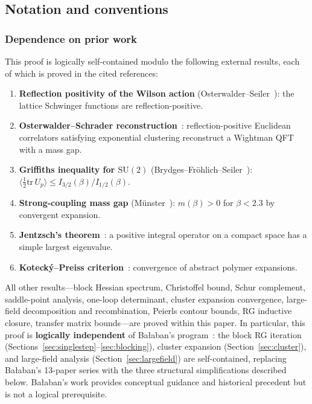 \documentclass[11pt]{article}
\theoremstyle{definition}
\newcommand{\SU}{\mathrm{SU}}
\newcommand{\tr}{\mathrm{tr}}
\begin{document}
\subsection{Notation and conventions}

\subsubsection*{Dependence on prior work}

This proof is logically self-contained modulo the following external
results, each of which is proved in the cited references:

\begin{enumerate}[nosep,label=(E\arabic*)]
\item \textbf{Reflection positivity of the Wilson action}
(Osterwalder--Seiler~\cite{OS78}): the lattice Schwinger functions
are reflection-positive.
\item \textbf{Osterwalder--Schrader reconstruction}~\cite{OS73}:
reflection-positive Euclidean correlators satisfying exponential
clustering reconstruct a Wightman QFT with a mass gap.
\item \textbf{Griffiths inequality for $\SU(2)$}
(Brydges--Fr\"ohlich--Seiler~\cite{FroehlichSimon}):
$\langle\frac{1}{2}\tr\,U_p\rangle\le I_{3/2}(\beta)/I_{1/2}(\beta)$.
\item \textbf{Strong-coupling mass gap} (M\"unster~\cite{Munster81}):
$m(\beta)>0$ for $\beta<2.3$ by convergent expansion.
\item \textbf{Jentzsch's theorem}~\cite{Seiler82}: a positive integral
operator on a compact space has a simple largest eigenvalue.
\item \textbf{Koteck\'y--Preiss criterion}~\cite{KP}: convergence of
abstract polymer expansions.
\end{enumerate}

\noindent All other results---block Hessian spectrum, Christoffel
bound, Schur complement, saddle-point analysis, one-loop
determinant, cluster expansion convergence, large-field
decomposition and recombination, Peierls contour bounds, RG
inductive closure, transfer matrix bounds---are proved within this
paper.  In particular, this proof is \textbf{logically independent}
of Ba\l aban's program~\cite{BalabanI,BalabanII,BalabanIII,BalabanLF1,BalabanLF2}:
the block RG iteration (Sections~\ref{sec:singlestep}--\ref{sec:blocking}),
cluster expansion (Section~\ref{sec:cluster}), and large-field analysis
(Section~\ref{sec:largefield}) are self-contained, replacing Ba\l aban's
13-paper series with the three structural simplifications described
below.  Ba\l aban's work provides conceptual guidance and historical
precedent but is not a logical prerequisite.
\end{document}

